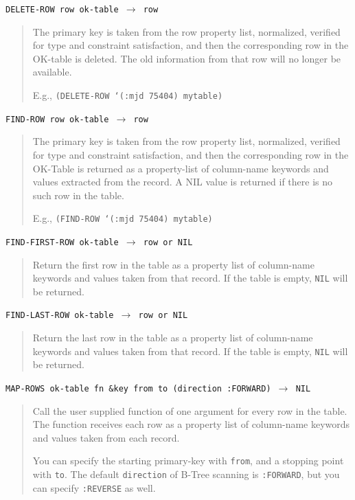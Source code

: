 \documentclass[article,oneside]{memoir}
\begin{document}
\noindent \texttt{DELETE-ROW row ok-table $\rightarrow$ row}

\begin{quote}
The primary key is taken from the row property list, normalized, verified for type and constraint satisfaction, and then the corresponding row in the OK-table is deleted. The old information from that row will no longer be available.

E.g., \texttt{(DELETE-ROW `(:mjd 75404) mytable)}
\end{quote}

\noindent \texttt{FIND-ROW row ok-table $\rightarrow$ row}

\begin{quote}
The primary key is taken from the row property list, normalized, verified for type and constraint satisfaction, and then the corresponding row in the OK-Table is returned as a property-list of column-name keywords and values extracted from the record. A NIL value is returned if there is no such row in the table.

E.g., \texttt{(FIND-ROW `(:mjd 75404) mytable)}
\end{quote}

\noindent \texttt{FIND-FIRST-ROW ok-table $\rightarrow$ row or NIL}

\begin{quote}
Return the first row in the table as a property list of column-name keywords and values taken from that record. If the table is empty, \texttt{NIL} will be returned.
\end{quote}

\noindent \texttt{FIND-LAST-ROW ok-table $\rightarrow$ row or NIL}

\begin{quote}
Return the last row in the table as a property list of column-name keywords and values taken from that record. If the table is empty, \texttt{NIL} will be returned.
\end{quote}

\noindent \texttt{MAP-ROWS ok-table fn \&key from to (direction :FORWARD) $\rightarrow$ NIL}

\begin{quote}
Call the user supplied function of one argument for every row in the table. The function receives each row as a property list of column-name keywords and values taken from each record.

 You can specify the starting primary-key with \texttt{from}, and a stopping point with \texttt{to}. The default \texttt{direction} of B-Tree scanning is \texttt{:FORWARD}, but you can specify \texttt{:REVERSE} as well.
\end{quote}
\end{document}
